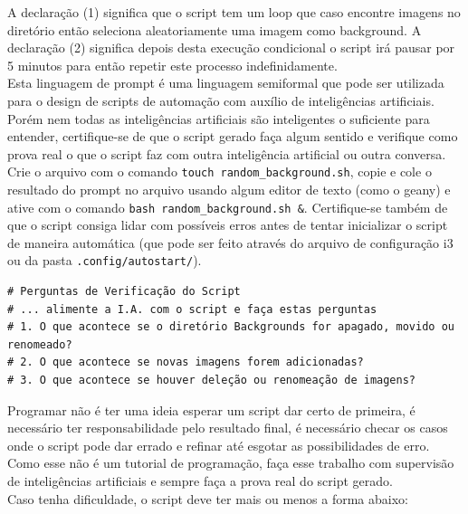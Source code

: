 \documentclass[12pt,a4paper]{article}
\begin{document}
\vspace{\baselineskip}

A declaração (1) significa que o script tem um loop que caso encontre imagens no diretório então seleciona aleatoriamente uma imagem como background. A declaração (2) significa depois desta execução condicional o script irá pausar por 5 minutos para então repetir este processo indefinidamente. \\

Esta linguagem de prompt é uma linguagem semiformal que pode ser utilizada para o design de scripts de automação com auxílio de inteligências artificiais. Porém nem todas as inteligências artificiais são inteligentes o suficiente para entender, certifique-se de que o script gerado faça algum sentido e verifique como prova real o que o script faz com outra inteligência artificial ou outra conversa.\\

Crie o arquivo com o comando \texttt{touch random\_background.sh}, copie e cole o resultado do prompt no arquivo usando algum editor de texto (como o geany) e ative com o comando \texttt{bash random\_background.sh \&}. Certifique-se também de que o script consiga lidar com possíveis erros antes de tentar inicializar o script de maneira automática (que pode ser feito através do arquivo de configuração i3 ou da pasta \texttt{.config/autostart/}). \\

\begin{lstlisting}
# Perguntas de Verificação do Script
# ... alimente a I.A. com o script e faça estas perguntas 
# 1. O que acontece se o diretório Backgrounds for apagado, movido ou renomeado?
# 2. O que acontece se novas imagens forem adicionadas?
# 3. O que acontece se houver deleção ou renomeação de imagens?
\end{lstlisting}

\vspace{\baselineskip}

Programar não é ter uma ideia esperar um script dar certo de primeira, é necessário ter responsabilidade pelo resultado final, é necessário checar os casos onde o script pode dar errado e refinar até esgotar as possibilidades de erro. Como esse não é um tutorial de programação, faça esse trabalho com supervisão de inteligências artificiais e sempre faça a prova real do script gerado. \\

Caso tenha dificuldade, o script deve ter mais ou menos a forma abaixo:\\
\end{document}
